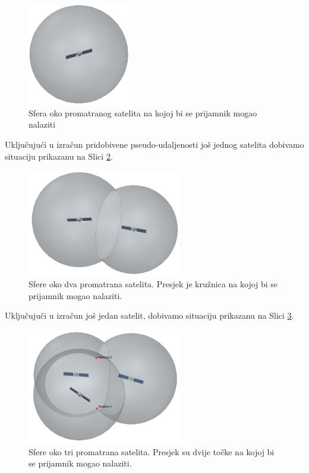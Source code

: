 \documentclass[a4paper,twoside,12pt]{memoir} %
\begin{document}
	\begin{figure}[H]
		\centering
		\includegraphics[width=0.4\textwidth]{satellite_distance_13D}
		\caption{Sfera oko promatranog satelita na kojoj bi se prijamnik mogao nalaziti \cite{gps:2}}
		\label{Fig:1SatelitePosition}
	\end{figure}
	Uključujući u izračun pridobivene pseudo-udaljenosti još jednog satelita dobivamo situaciju prikazanu na Slici \ref{Fig:2SatelitePosition}.
	\begin{figure}[H]
		\centering
		\includegraphics[width=0.6\textwidth]{satellites_distance_23D}
		\caption{Sfere oko dva promatrana satelita. Presjek je kružnica na kojoj bi se prijamnik mogao nalaziti. \cite{gps:2}}
		\label{Fig:2SatelitePosition}
	\end{figure}
	Uključujuči u izračun još jedan satelit, dobivamo situaciju prikazanu na Slici \ref{Fig:3SatelitePosition}.
	
	\begin{figure}[H]
		\centering
		\includegraphics[width=0.6\textwidth]{satellites_distance_33D}
		\caption{Sfere oko tri promatrana satelita. Presjek su dvije točke na kojoj bi se prijamnik mogao nalaziti. \cite{gps:2}}
		\label{Fig:3SatelitePosition}
	\end{figure}
	
\end{document}
